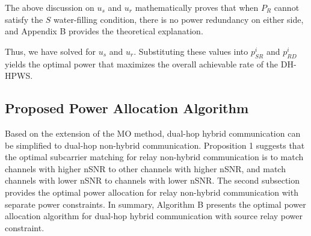 \documentclass[lettersize,journal]{IEEEtran}
\begin{document}
	The above discussion on \( u_s \) and \( u_r \) mathematically proves that when \( P_R \) cannot satisfy the \(S\) water-filling condition, there is no power redundancy on either side, and Appendix B provides the theoretical explanation.
	
	Thus, we have solved for \( u_s \) and \( u_r \). Substituting these values into \(p_{SR}^i \) and \( p_{RD}^i \) yields the optimal power that maximizes the overall achievable rate of the DH-HPWS.
	
	\subsection{Proposed Power Allocation Algorithm}
	Based on the extension of the MO method, dual-hop hybrid communication can be simplified to dual-hop non-hybrid communication. Proposition 1 suggests that the optimal subcarrier matching for relay non-hybrid communication is to match channels with higher nSNR to other channels with higher nSNR, and match channels with lower nSNR to channels with lower nSNR. The second subsection provides the optimal power allocation for relay non-hybrid communication with separate power constraints. In summary, Algorithm B presents the optimal power allocation algorithm for dual-hop hybrid communication with source relay power constraint.
\end{document}
